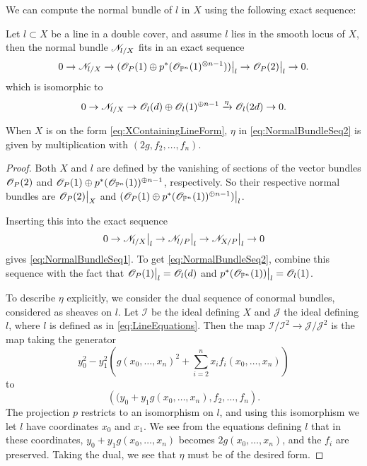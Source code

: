 We can compute the normal bundle of $l$ in $X$ using the following exact sequence:
\begin{proposition}
  \label{prop:NormalBundleSeq}
Let $l \subset X$ be a line in a double cover, and assume $l$ lies in the smooth locus of $X$, then the normal bundle $\mathscr{N}_{l/X}$ fits in an exact sequence
\begin{equation}
\label{eq:NormalBundleSeq1}
0 \to  \sN_{l/X} \to  \restr{(\sO_P(1) \oplus p^*(\sO_{\P^n}(1)^{\otimes n-1}))}{l} \to \restr{\sO_P(2)}{l}  \to 0.
\end{equation}
which is isomorphic to
\begin{equation}
\label{eq:NormalBundleSeq2}
0 \to  \mathscr{N}_{l/X} \to  \mathscr{O}_l(d) \oplus \mathscr{O}_l(1)^{\oplus n-1} \xrightarrow{\eta} \mathscr{O}_l(2d)  \to 0.
\end{equation}

When $X$ is on the form \eqref{eq:XContainingLineForm}, $\eta$ in \eqref{eq:NormalBundleSeq2} is given by multiplication with $(2g,f_2,\dots,f_n)$.
\end{proposition}

\begin{proof}
Both $X$ and $l$ are defined by the vanishing of sections of the vector bundles $\mathscr{O}_P(2)$ and $\mathscr{O}_P(1) \oplus  p^*(\mathscr{O}_{\mathbb{P}^n}(1))^{\oplus n-1}$, respectively. So their respective normal bundles are $\restr{\sO_P(2)}{X}$ and $\restr{(\sO_P(1) \oplus  p^*(\sO_{\P^n}(1))^{\oplus n-1})}{l}$.

Inserting this into the exact sequence
\[0 \to  \restr{\sN_{l/X}}{l} \to \restr{\sN_{l/P}}{l} \to  \restr{\sN_{X/P}}{l} \to 0 \]
gives \eqref{eq:NormalBundleSeq1}. To get \eqref{eq:NormalBundleSeq2}, combine this sequence with the fact that $\restr{\sO_P(1)}{l} = \sO_l(d)$ and $\restr{p^*(\sO_{\P^n}(1))}{l} = \sO_l(1)$.

To describe $\eta$ explicitly, we consider the dual sequence of conormal bundles, considered as sheaves on $l$. Let $\mathcal{I}$ be the ideal defining $X$ and $\mathcal{J}$ the ideal defining $l$, where $l$ is defined as in \eqref{eq:LineEquations}. Then the map $\mathcal{I}/\mathcal{I}^2 \to \mathcal{J}/\mathcal{J}^2$ is the map taking the generator 
\[y_0^2 - y_1^2\left(g(x_0,\dots,x_n)^2 + \sum_{i=2}^nx_if_i(x_0,\dots,x_n)\right) \]
to
\[ \left( (y_0 + y_1g(x_0,\dots,x_n), f_2, \dots, f_n \right).\]
The projection $p$ restricts to an isomorphism on $l$, and using this isomorphism we let $l$ have coordinates $x_0$ and $x_1$. We see from the equations defining $l$ that in these coordinates, $y_0 + y_1g(x_0,\dots,x_n)$ becomes $2g(x_0,\dots,x_n)$, and the $f_i$ are preserved. Taking the dual, we see that $\eta$ must be of the desired form.
\end{proof}


